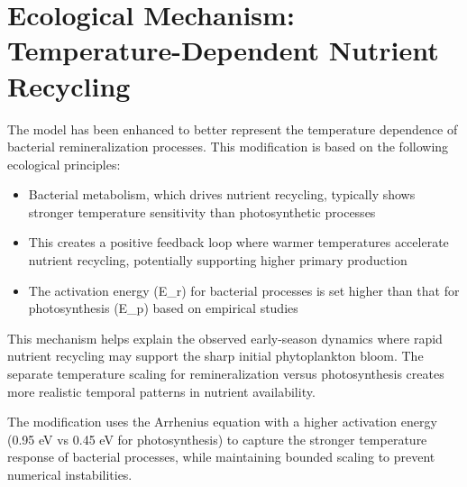 \section{Ecological Mechanism: Temperature-Dependent Nutrient Recycling}

The model has been enhanced to better represent the temperature dependence of bacterial remineralization processes. This modification is based on the following ecological principles:

\begin{itemize}
    \item Bacterial metabolism, which drives nutrient recycling, typically shows stronger temperature sensitivity than photosynthetic processes
    \item This creates a positive feedback loop where warmer temperatures accelerate nutrient recycling, potentially supporting higher primary production
    \item The activation energy (E_r) for bacterial processes is set higher than that for photosynthesis (E_p) based on empirical studies
\end{itemize}

This mechanism helps explain the observed early-season dynamics where rapid nutrient recycling may support the sharp initial phytoplankton bloom. The separate temperature scaling for remineralization versus photosynthesis creates more realistic temporal patterns in nutrient availability.

The modification uses the Arrhenius equation with a higher activation energy (0.95 eV vs 0.45 eV for photosynthesis) to capture the stronger temperature response of bacterial processes, while maintaining bounded scaling to prevent numerical instabilities.

